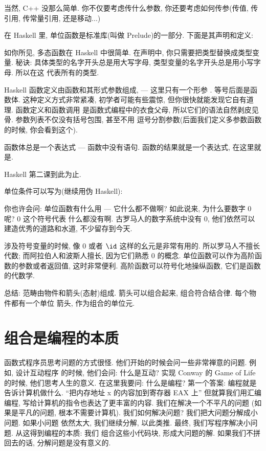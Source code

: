 当然, C++ 没那么简单. 你不仅要考虑传什么参数, 你还要考虑如何传参(传值, 传引用, 传常量引用, 还是移动...)

在 Haskell 里, 单位函数是标准库(叫做 Prelude)的一部分. 下面是其声明和定义:


如你所见, 多态函数在 Haskell 中很简单. 在声明中, 你只需要把类型替换成类型变量. 秘诀:
具体类型的名字开头总是用大写字母, 类型变量的名字开头总是用小写字母. 所以在这 
代表所有的类型.

Haskell 函数定义由函数和其形式参数组成, --- 这里只有一个形参 . 等号后面是函数体.
这种定义方式非常紧凑, 初学者可能有些震惊, 但你很快就能发现它自有道理. 函数定义和函数调用
是函数式编程中的衣食父母, 所以它们的语法自然剥皮见骨. 参数列表不仅没有括号包围, 甚至不用
逗号分割参数(后面我们定义多参数函数的时候, 你会看到这个).

函数体总是一个表达式 --- 函数中没有语句. 函数的结果就是一个表达式, 在这里就是.

Haskell 第二课到此为止.

单位条件可以写为(继续用伪 Haskell):

你也许会问: 单位函数有什么用 --- 它什么都不做啊? 如此说来, 为什么要数字 0 呢? 0 这个符号代表
什么都没有啊. 古罗马人的数字系统中没有 0, 他们依然可以建造优秀的道路和水道, 不少留存到今天.

涉及符号变量的时候, 像 0 或者 $\id$ 这样的幺元是非常有用的. 所以罗马人不擅长代数;
而阿拉伯人和波斯人擅长, 因为它们熟悉 0 的概念. 单位函数可以作为高阶函数的参数或者返回值,
这时非常便利. 高阶函数可以符号化地操纵函数, 它们是函数的代数学.

总结: 范畴由物件和箭头(态射)组成. 箭头可以组合起来, 组合符合结合律. 每个物件都有一个单位
箭头, 作为组合的单位元.

\section{组合是编程的本质}

函数式程序员思考问题的方式很怪. 他们开始的时候会问一些非常禅意的问题. 例如, 设计互动程序
的时候, 他们会问: 什么是互动? 实现 Conway 的 Game of Life 的时候, 他们思考人生的意义.
在这里我要问: 什么是编程? 第一个答案: 编程就是告诉计算机做什么. ``把内存地址 x 的内容加到寄存器 EAX 上''
但就算我们用汇编编程, 写给计算机的指令也表达了更丰富的内容. 我们在解决一个不平凡的问题
(如果是平凡的问题, 根本不需要计算机). 我们如何解决问题? 我们把大问题分解成小问题. 如果小问题
依然太大, 我们继续分解, 以此类推. 最终, 我们写程序解决小问题. 从这得到编程的本质: 我们
组合这些小代码块, 形成大问题的解. 如果我们不拼回去的话, 分解问题是没有意义的.

